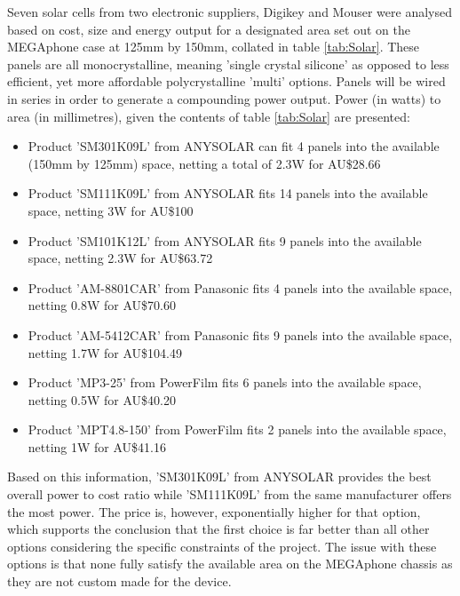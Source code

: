 Seven solar cells from two electronic suppliers, Digikey and Mouser were analysed based on cost, size and energy output for a designated area set out on the MEGAphone case at 125mm by 150mm, collated in table \ref{tab:Solar}.
These panels are all monocrystalline, meaning 'single crystal silicone' as opposed to less efficient, yet more affordable polycrystalline 'multi' options.
Panels will be wired in series in order to generate a compounding power output.
\vspace{5mm}
Power (in watts) to area (in millimetres), given the contents of table \ref{tab:Solar} are presented:
\begin{itemize}
    \item Product 'SM301K09L' \cite{SM301K09L} from ANYSOLAR can fit 4 panels into the available (150mm by 125mm) space, netting a total of 2.3W for AU\$28.66
    \item Product 'SM111K09L' \cite{SM111K09L} from ANYSOLAR fits 14 panels into the available space, netting 3W for AU\$100
    \item Product 'SM101K12L' \cite{SM101K12L} from ANYSOLAR fits 9 panels into the available space, netting 2.3W for AU\$63.72
    \item Product 'AM-8801CAR' \cite{am8801} from Panasonic fits 4 panels into the available space, netting 0.8W for AU\$70.60
    \item Product 'AM-5412CAR' \cite{am5412} from Panasonic fits 9 panels into the available space, netting 1.7W for AU\$104.49
    \item Product 'MP3-25' \cite{mp3} from PowerFilm fits 6 panels into the available space, netting 0.5W for AU\$40.20
    \item Product 'MPT4.8-150' \cite{mpt} from PowerFilm fits 2 panels into the available space, netting 1W for AU\$41.16
\end{itemize}

Based on this information, 'SM301K09L' from ANYSOLAR provides the best overall power to cost ratio while 'SM111K09L' from the same manufacturer offers the most power.
The price is, however, exponentially higher for that option, which supports the conclusion that the first choice is far better than all other options considering the specific constraints of the project.
The issue with these options is that none fully satisfy the available area on the MEGAphone chassis as they are not custom made for the device.

